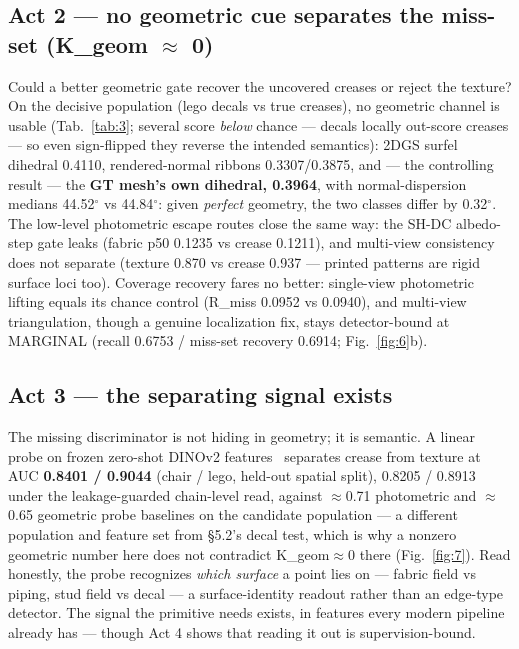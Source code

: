 \subsection{Act 2 --- no geometric cue separates the miss-set (K\_geom $\approx$ 0)}
Could a better geometric gate recover the uncovered creases or reject the texture? On the
decisive population (lego decals vs true creases), no geometric channel is usable (Tab.~\ref{tab:3};
several score \emph{below} chance --- decals locally out-score creases --- so even sign-flipped
they reverse the intended semantics): 2DGS surfel dihedral 0.4110, rendered-normal ribbons 0.3307/0.3875, and ---
the controlling result --- the \textbf{GT mesh's own dihedral, 0.3964}, with normal-dispersion
medians 44.52$^{\circ}$ vs 44.84$^{\circ}$: given \emph{perfect} geometry, the two classes differ by 0.32$^{\circ}$. The
low-level photometric escape routes close the same way: the SH-DC albedo-step gate leaks
(fabric p50 0.1235 vs crease 0.1211), and multi-view consistency does not separate
(texture 0.870 vs crease 0.937 --- printed patterns are rigid surface loci too). Coverage
recovery fares no better: single-view photometric lifting equals its chance control
(R\_miss 0.0952 vs 0.0940), and multi-view triangulation, though a genuine localization
fix, stays detector-bound at MARGINAL (recall 0.6753 / miss-set recovery 0.6914; Fig.~\ref{fig:6}b).

\subsection{Act 3 --- the separating signal exists}
The missing discriminator is not hiding in geometry; it is semantic. A linear probe on
frozen zero-shot DINOv2 features~\cite{dinov2} separates crease from texture at AUC \textbf{0.8401 / 0.9044}
(chair / lego, held-out spatial split), 0.8205 / 0.8913 under the leakage-guarded
chain-level read, against $\approx$0.71 photometric and $\approx$0.65 geometric probe baselines on the candidate
population --- a different population and feature set from \S5.2's decal test, which is why
a nonzero geometric number here does not contradict K\_geom$\approx$0 there (Fig.~\ref{fig:7}). Read
honestly, the probe recognizes \emph{which surface} a point lies on --- fabric field vs piping,
stud field vs decal --- a surface-identity readout rather than an edge-type detector. The
signal the primitive needs exists, in features every modern pipeline already has --- though
Act 4 shows that reading it out is supervision-bound.

